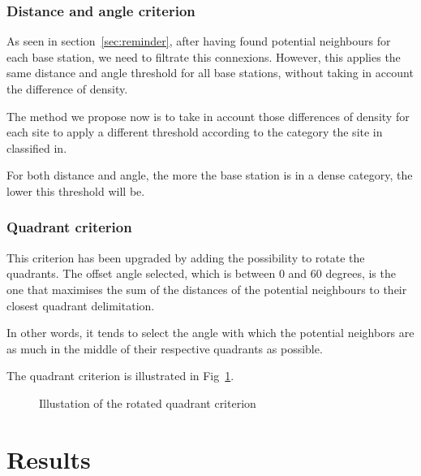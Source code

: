 \documentclass[lettersize,journal,english]{IEEEtran}
\begin{document}
        \subsubsection{Distance and angle criterion}
            As seen in section~\ref{sec:reminder}, after having found potential neighbours for each base station, we need to filtrate this connexions. However, this applies the same distance and angle threshold for all base stations, without taking in account the difference of density.

            The method we propose now is to take in account those differences of density for each site to apply a different threshold according to the category the site in classified in.

            For both distance and angle, the more the base station is in a dense category, the lower this threshold will be.

        \subsubsection{Quadrant criterion}
            This criterion has been upgraded by adding the possibility to rotate the quadrants. The offset angle selected, which is between $0$ and $60$ degrees, is the one that maximises the sum of the distances of the potential neighbours to their closest quadrant delimitation.

            In other words, it tends to select the angle with which the potential neighbors are as much in the middle of their respective quadrants as possible.

            The quadrant criterion is illustrated in Fig~\ref{fig:crit_qua}.
            \begin{figure}
                \centering
                \caption{Illustation of the rotated quadrant criterion}
                \label{fig:crit_qua}
            \end{figure}

\section{Results}
\end{document}
